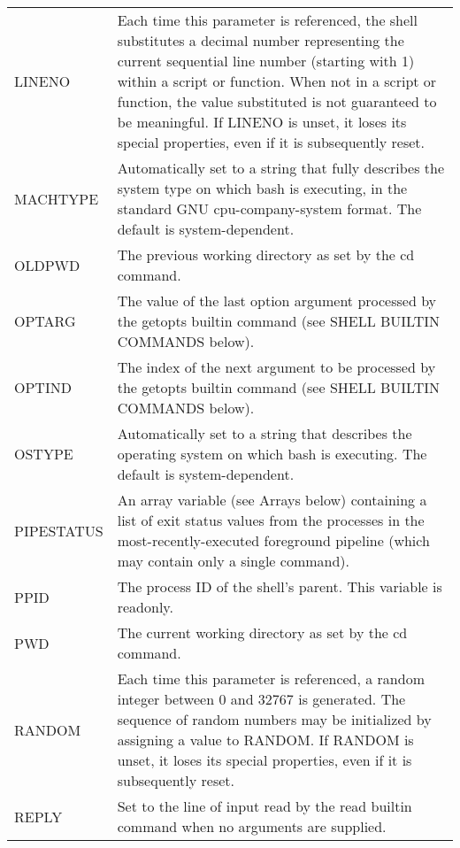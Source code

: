 \documentclass[11pt]{article}
\begin{document}
\begin{longtable}{p{}p{}}
LINENO &
Each time this parameter is referenced, the shell substitutes a decimal number representing the current sequential line number (starting with 1) within a script or function. When not in a script or function, the value substituted is not guaranteed to be meaningful. If LINENO is unset, it loses its special properties, even if it is subsequently reset.\\

MACHTYPE &
Automatically set to a string that fully describes the system type on which bash is executing, in the standard GNU cpu-company-system format. The default is system-dependent. \\

OLDPWD &
The previous working directory as set by the cd command. \\

OPTARG &
The value of the last option argument processed by the getopts builtin command (see SHELL BUILTIN COMMANDS below). \\

OPTIND &
The index of the next argument to be processed by the getopts builtin command (see SHELL BUILTIN COMMANDS below). \\

OSTYPE &
Automatically set to a string that describes the operating system on which bash is executing. The default is system-dependent. \\

PIPESTATUS &
An array variable (see Arrays below) containing a list of exit status values from the processes in the most-recently-executed foreground pipeline (which may contain only a single command). \\

PPID &
The process ID of the shell's parent. This variable is readonly. \\

PWD &
The current working directory as set by the cd command. \\

RANDOM &
Each time this parameter is referenced, a random integer between 0 and 32767 is generated. The sequence of random numbers may be initialized by assigning a value to RANDOM. If RANDOM is unset, it loses its special properties, even if it is subsequently reset. \\

REPLY &
Set to the line of input read by the read builtin command when no arguments are supplied. \\


\end{longtable}
\end{document}
